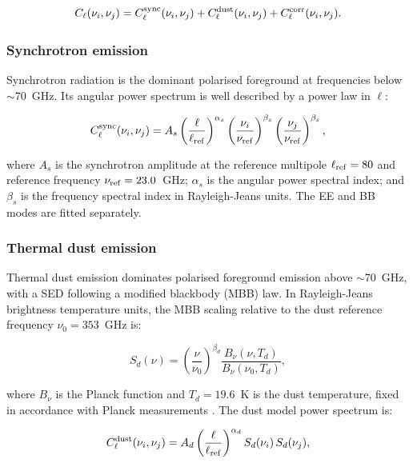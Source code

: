 \begin{equation}
C_\ell(\nu_i, \nu_j) = C_\ell^{\rm sync}(\nu_i, \nu_j) + C_\ell^{\rm dust}(\nu_i, \nu_j) + C_\ell^{\rm corr}(\nu_i, \nu_j).
\end{equation}

\subsubsection{Synchrotron emission}

Synchrotron radiation is the dominant polarised foreground at frequencies below $\sim$70~GHz. Its angular power spectrum is well described by a power law in $\ell$:

\begin{equation}
C_\ell^{\rm sync}(\nu_i, \nu_j) = A_s \left(\frac{\ell}{\ell_{\rm ref}}\right)^{\alpha_s}
\left(\frac{\nu_i}{\nu_{\rm ref}}\right)^{\beta_s} \left(\frac{\nu_j}{\nu_{\rm ref}}\right)^{\beta_s},
\end{equation}

where $A_s$ is the synchrotron amplitude at the reference multipole $\ell_{\rm ref} = 80$ and reference frequency $\nu_{\rm ref} = 23.0$~GHz; $\alpha_s$ is the angular power spectral index; and $\beta_s$ is the frequency spectral index in Rayleigh-Jeans units. The EE and BB modes are fitted separately.

\subsubsection{Thermal dust emission}

Thermal dust emission dominates polarised foreground emission above $\sim$70~GHz, with a SED following a modified blackbody (MBB) law. In Rayleigh-Jeans brightness temperature units, the MBB scaling relative to the dust reference frequency $\nu_0 = 353$~GHz is:

\begin{equation}
S_d(\nu) = \left(\frac{\nu}{\nu_0}\right)^{\beta_d} \frac{B_\nu(\nu, T_d)}{B_\nu(\nu_0, T_d)},
\end{equation}

where $B_\nu$ is the Planck function and $T_d = 19.6$~K is the dust temperature, fixed in accordance with Planck measurements \citep{Planck_2015X}. The dust model power spectrum is:

\begin{equation}
C_\ell^{\rm dust}(\nu_i, \nu_j) = A_d \left(\frac{\ell}{\ell_{\rm ref}}\right)^{\alpha_d}
S_d(\nu_i)\, S_d(\nu_j),
\end{equation}

